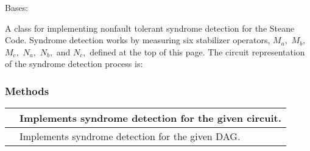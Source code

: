 \documentclass[letterpaper,10pt,english]{sphinxmanual}
\begin{document}
\begin{fulllineitems}
\begin{fulllineitems}
\begin{quote}
\begin{description}
\begin{description}
\end{description}

\end{description}\end{quote}

\end{fulllineitems}


\end{fulllineitems}


\begin{fulllineitems}
\label{\detokenize{Steane:Steane.SteaneSyndromeDetector}}
Bases: {\hyperref[\detokenize{Base:BaseFaultTolerance.SyndromeDetector}]{}}

A class for implementing non\sphinxhyphen{}fault tolerant syndrome detection for the Steane Code.
Syndrome detection works by measuring six stabilizer operators, \(M_a,\) \(M_b,\) \(M_c,\) \(N_a,\) \(N_b,\) and \(N_c,\) defined at the top of this page.
The circuit representation of the syndrome detection process is:

\begin{figure}[htbp]
\centering

\noindent{}
\end{figure}
\subsubsection*{Methods}


\begin{savenotes}\sphinxattablestart
\centering
\begin{tabulary}{\linewidth}[t]{|T|T|}
\hline

&
Implements syndrome detection for the given circuit.
\\
\hline
{}
&
Implements syndrome detection for the given DAG.
\\
\hline
\end{tabulary}
\par
\sphinxattableend\end{savenotes}


\end{fulllineitems}
\end{document}
